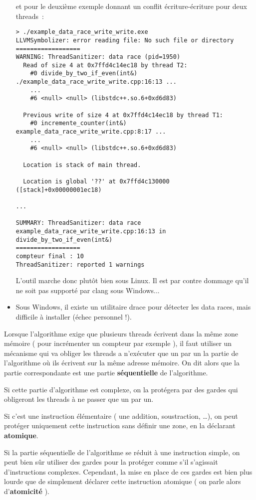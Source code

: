 \documentclass[fleqn,11pt]{article}
\begin{document}
\begin{itemize}
et pour le deuxième exemple donnant un conflit écriture-écriture pour deux threads~:
\begin{verbatim}
> ./example_data_race_write_write.exe
LLVMSymbolizer: error reading file: No such file or directory
==================
WARNING: ThreadSanitizer: data race (pid=1950)
  Read of size 4 at 0x7ffd4c14ec18 by thread T2:
    #0 divide_by_two_if_even(int&) ./example_data_race_write_write.cpp:16:13 ...
    ...
    #6 <null> <null> (libstdc++.so.6+0xd6d83)

  Previous write of size 4 at 0x7ffd4c14ec18 by thread T1:
    #0 incremente_counter(int&) example_data_race_write_write.cpp:8:17 ...
    ...
    #6 <null> <null> (libstdc++.so.6+0xd6d83)

  Location is stack of main thread.

  Location is global '??' at 0x7ffd4c130000 ([stack]+0x00000001ec18)

...

SUMMARY: ThreadSanitizer: data race example_data_race_write_write.cpp:16:13 in divide_by_two_if_even(int&)
==================
compteur final : 10
ThreadSanitizer: reported 1 warnings
\end{verbatim}

  L'outil marche donc plutôt bien sous Linux. Il est par contre dommage qu'il ne soit pas supporté par
  clang sous Windows...
\item Sous Windows, il existe un utilitaire drace pour détecter les data races, mais difficile à installer (échec personnel !).
\end{itemize}

Lorsque l'algorithme exige que plusieurs threads écrivent dans la même zone mémoire ( pour incrémenter un
compteur par exemple ), il faut utiliser un mécanisme qui va obliger les threads a n'exécuter que un par un
la partie de l'algorithme où ils écrivent sur la même adresse mémoire. On dit alors que la partie correspondante est une partie \textbf{séquentielle} de l'algorithme.

Si cette partie d'algorithme est complexe, on la protégera par des gardes qui obligeront les threads à ne passer que un par un.

Si c'est une instruction élémentaire ( une addition, soustraction, \ldots ), on peut protéger uniquement cette instruction sans définir une zone, en la déclarant \textbf{atomique}.

Si la partie séquentielle de l'algorithme se réduit à une instruction simple, on peut bien sûr utiliser des gardes pour la protéger comme s'il s'agissait d'instructions complexes. Cependant, la mise en place de ces gardes est bien plus lourde que de simplement déclarer cette instruction atomique ( on parle alors d'\textbf{atomicité} ).
\end{document}
